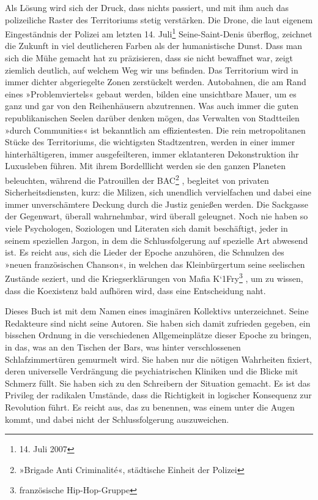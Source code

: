 Als Lösung wird sich der Druck, dass nichts passiert, und mit ihm
auch das polizeiliche Raster des Territoriums stetig verstärken.
Die Drone, die laut eigenem Eingeständnis der Polizei am letzten
14. Juli\footnote{
14. Juli 2007}
Seine-Saint-Denis überflog, zeichnet die Zukunft in viel
deutlicheren Farben als der humanistische Dunst. Dass man sich die
Mühe gemacht hat zu präzisieren, dass sie nicht bewaffnet war,
zeigt ziemlich deutlich, auf welchem Weg wir uns befinden. Das
Territorium wird in immer dichter abgeriegelte Zonen zerstückelt
werden. Autobahnen, die am Rand eines »Problemviertels« gebaut
werden, bilden eine unsichtbare Mauer, um es ganz und gar von den
Reihenhäusern abzutrennen. Was auch immer die guten
republikanischen Seelen darüber denken mögen, das Verwalten von
Stadtteilen »durch Communities« ist bekanntlich am effizientesten.
Die rein metropolitanen Stücke des Territoriums, die wichtigsten
Stadtzentren, werden in einer immer hinterhältigeren, immer
ausgefeilteren, immer eklatanteren Dekonstruktion ihr Luxusleben
führen. Mit ihrem Bordelllicht werden sie den ganzen Planeten
beleuchten, während die Patrouillen der BAC\footnote{
»Brigade Anti Criminalité«, städtische Einheit der Polizei}%
, begleitet von
privaten Sicherheitsdiensten, kurz: die Milizen, sich unendlich
vervielfachen und dabei eine immer unverschämtere Deckung durch
die Justiz genießen werden.
Die Sackgasse der Gegenwart, überall wahrnehmbar, wird überall
geleugnet. Noch nie haben so viele Psychologen, Soziologen und
Literaten sich damit beschäftigt, jeder in seinem speziellen
Jargon, in dem die Schlussfolgerung auf spezielle Art abwesend ist.
Es reicht aus, sich die Lieder der Epoche anzuhören, die Schnulzen
des »neuen französischen Chanson«, in welchen das Kleinbürgertum
seine seelischen Zustände seziert, und die Kriegserklärungen von
Mafia K‘1Fry\footnote{
französische Hip-Hop-Gruppe}%
, um zu wissen, dass die Koexistenz bald aufhören
wird, dass eine Entscheidung naht.

\extrapar{}

Dieses Buch ist mit dem Namen eines imaginären Kollektivs
unterzeichnet. Seine Redakteure sind nicht seine Autoren. Sie haben
sich damit zufrieden gegeben, ein bisschen Ordnung in die
verschiedenen Allgemeinplätze dieser Epoche zu bringen, in das, was
an den Tischen der Bars, was hinter verschlossenen
Schlafzimmertüren gemurmelt wird. Sie haben nur die nötigen
Wahrheiten fixiert, deren universelle Verdrängung die
psychiatrischen Kliniken und die Blicke mit Schmerz füllt. Sie
haben sich zu den Schreibern der Situation gemacht. Es ist das
Privileg der radikalen Umstände, dass die Richtigkeit in logischer
Konsequenz zur Revolution führt. Es reicht aus, das zu benennen,
was einem unter die Augen kommt, und dabei nicht der
Schlussfolgerung auszuweichen.

